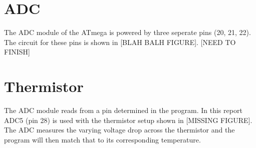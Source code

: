 \documentclass[main.tex]{subfiles}
\begin{document}
	\section{ADC}
	The ADC module of the ATmega is powered by three seperate pins (20, 21, 22). The circuit for
	these pins is shown in [BLAH BALH FIGURE]. [NEED TO FINISH]
	
	\section{Thermistor}
	The ADC module reads from a pin determined in the program. In this report ADC5 (pin 28) is used
	with the thermistor setup shown in [MISSING FIGURE]. The ADC measures the varying voltage drop
	across the thermistor and the program will then match that to its corresponding temperature.
	
\end{document}
